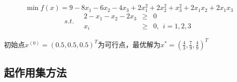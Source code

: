\documentclass[11pt,a4paper]{article}
\begin{document}
\[\min f(x)=9-8x_1-6x_2-4x_3+2x_1^2+2x_2^2+x_3^2+2x_1x_2+2x_1x_3\]
\[s.t.\quad\begin{array}{rcl}
2-x_1-x_2-2x_3 & \ge & 0\\
x_i & \ge & 0,~~i=1,2,3
\end{array}\]

初始点$x^{(0)}=(0.5,0.5,0.5)^T$为可行点，最优解为$x^*=(\frac{4}{3},\frac{7}{9},\frac{4}{9})^T$

\subsection{起作用集方法}

\begin{codebox}
\end{codebox}
\end{document}
